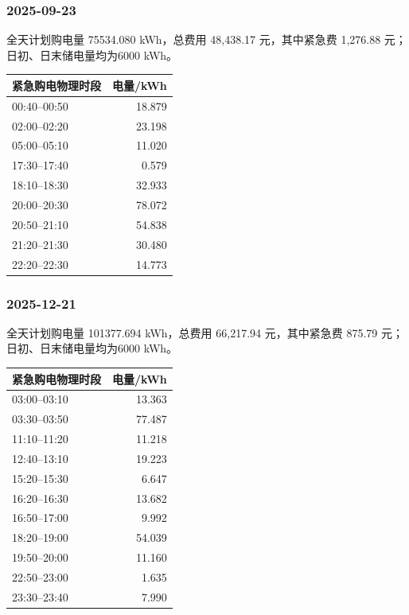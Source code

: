 \subsubsection*{2025-09-23}
\begin{center}\small\quad\end{center}
全天计划购电量 75534.080 kWh，总费用 48,438.17 元，其中紧急费 1,276.88 元；日初、日末储电量均为6000 kWh。
\begin{longtable}{lr}\toprule 紧急购电物理时段 & 电量/kWh\\\midrule\endhead
00:40--00:50 & 18.879 \\
02:00--02:20 & 23.198 \\
05:00--05:10 & 11.020 \\
17:30--17:40 & 0.579 \\
18:10--18:30 & 32.933 \\
20:00--20:30 & 78.072 \\
20:50--21:10 & 54.838 \\
21:20--21:30 & 30.480 \\
22:20--22:30 & 14.773 \\
\bottomrule\end{longtable}
\subsubsection*{2025-12-21}
\begin{center}\small\quad\end{center}
全天计划购电量 101377.694 kWh，总费用 66,217.94 元，其中紧急费 875.79 元；日初、日末储电量均为6000 kWh。
\begin{longtable}{lr}\toprule 紧急购电物理时段 & 电量/kWh\\\midrule\endhead
03:00--03:10 & 13.363 \\
03:30--03:50 & 77.487 \\
11:10--11:20 & 11.218 \\
12:40--13:10 & 19.223 \\
15:20--15:30 & 6.647 \\
16:20--16:30 & 13.682 \\
16:50--17:00 & 9.992 \\
18:20--19:00 & 54.039 \\
19:50--20:00 & 11.160 \\
22:50--23:00 & 1.635 \\
23:30--23:40 & 7.990 \\
\bottomrule\end{longtable}